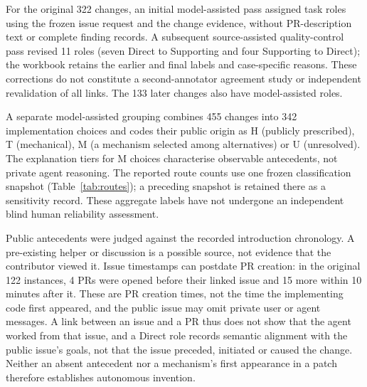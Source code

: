 \documentclass[acmsmall,screen,nonacm]{acmart}
\begin{document}
For the original 322 changes, an initial model-assisted pass assigned task roles using the frozen issue request and the change evidence, without PR-description text or complete finding records. A subsequent source-assisted quality-control pass revised 11 roles (seven Direct to Supporting and four Supporting to Direct); the workbook retains the earlier and final labels and case-specific reasons. These corrections do not constitute a second-annotator agreement study or independent revalidation of all links. The 133 later changes also have model-assisted roles.

A separate model-assisted grouping combines 455 changes into 342 implementation choices and codes their public origin as H (publicly prescribed), T (mechanical), M (a mechanism selected among alternatives) or U (unresolved). The explanation tiers for M choices characterise observable antecedents, not private agent reasoning. The reported route counts use one frozen classification snapshot (Table~\ref{tab:routes}); a preceding snapshot is retained there as a sensitivity record. These aggregate labels have not undergone an independent blind human reliability assessment.

Public antecedents were judged against the recorded introduction chronology. A pre-existing helper or discussion is a possible source, not evidence that the contributor viewed it. Issue timestamps can postdate PR creation: in the original 122 instances, 4 PRs were opened before their linked issue and 15 more within 10 minutes after it. These are PR creation times, not the time the implementing code first appeared, and the public issue may omit private user or agent messages. A link between an issue and a PR thus does not show that the agent worked from that issue, and a Direct role records semantic alignment with the public issue's goals, not that the issue preceded, initiated or caused the change. Neither an absent antecedent nor a mechanism's first appearance in a patch therefore establishes autonomous invention.
\end{document}
